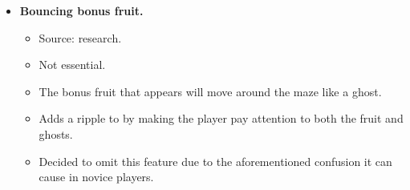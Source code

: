 \documentclass[letterpaper, 11pt]{article}
\begin{document}
\begin{itemize}
\item \textbf{Bouncing bonus fruit.}
\begin{itemize}
\item Source: research.
\item Not essential.
\item The bonus fruit that appears will move around the maze like a ghost.
\item Adds a ripple to by making the player pay attention to both the fruit and ghosts.
\item Decided to omit this feature due to the aforementioned confusion it can cause in novice players.
\end{itemize}
\end{itemize}

\printbibliography
\end{document}
